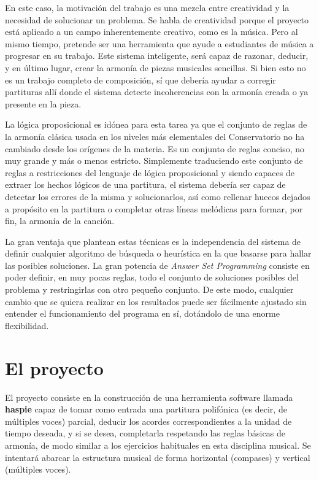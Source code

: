  En este caso, la motivación del trabajo es una mezcla entre creatividad y la necesidad de solucionar un problema. Se habla de creatividad porque el proyecto está aplicado a un campo inherentemente creativo, como es la música. Pero al mismo tiempo, pretende ser una herramienta que ayude a estudiantes de música a progresar en su trabajo. Este sistema inteligente, será capaz de razonar, deducir, y en último lugar, crear la armonía de piezas musicales sencillas. Si bien esto no es un trabajo completo de composición, sí que debería ayudar a corregir partituras allí donde el sistema detecte incoherencias con la armonía creada o ya presente en la pieza. 
 
La lógica proposicional es idónea para esta tarea ya que el conjunto de reglas de la armonía clásica usada en los niveles más elementales del Conservatorio no ha cambiado desde los orígenes de la materia. Es un conjunto de reglas conciso, no muy grande y más o menos estricto. Simplemente traduciendo este conjunto de reglas a restricciones del lenguaje de lógica proposicional y siendo capaces de extraer los hechos lógicos de una partitura, el sistema debería ser capaz de detectar los errores de la misma y solucionarlos, así como rellenar huecos dejados a propósito en la partitura o completar otras líneas melódicas para formar, por fin, la armonía de la canción.

La gran ventaja que plantean estas técnicas es la independencia del sistema de definir cualquier algoritmo de búsqueda o heurística en la que basarse para hallar las posibles soluciones. La gran potencia de \textit{Answer Set Programming} consiste en poder definir, en muy pocas reglas, todo el conjunto de soluciones posibles del problema y restringirlas con otro pequeño conjunto. De este modo, cualquier cambio que se quiera realizar en los resultados puede ser fácilmente ajustado sin entender el funcionamiento del programa en sí, dotándolo de una enorme flexibilidad.

 
 \section{El proyecto}
  \label{sec:the_project}
 El proyecto consiste en la construcción de una herramienta software llamada \textbf{haspie} capaz de tomar como entrada una partitura polifónica (es decir, de múltiples voces) parcial, deducir los acordes correspondientes a la unidad de tiempo deseada, y si se desea, completarla respetando las reglas básicas de armonía, de modo similar a los ejercicios habituales en esta disciplina musical. Se intentará abarcar la estructura musical de forma horizontal (compases) y vertical (múltiples voces). 
 
